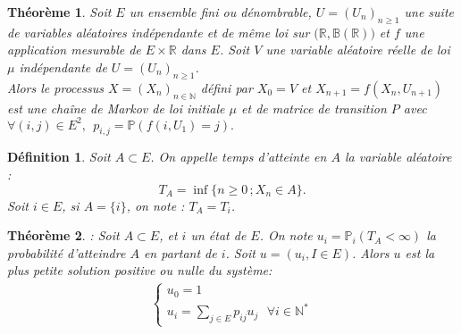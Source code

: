 \documentclass[12pt,a4paper]{report}
\newtheorem{thm}{Théorème}[section]
\newtheorem{definition}{Définition}[section]
\theoremstyle{remark}
\begin{document}
\begin{thm}\label{th1}
Soit $E$ un ensemble fini ou dénombrable, $U = (U_n)_{n\geq1}$ une suite de variables aléatoires indépendante et de même loi sur $(\mathbb{R},\mathbb{B(R))}$ et $f$ une application mesurable de $E \times \mathbb{R}$ dans $E$. Soit $V$ une variable aléatoire réelle de loi $\mu$ indépendante de 
$U = (U_n)_{n\geq1}$.\\
Alors le processus $X = (X_n)_{n\in \mathbb{N}}$ défini par $X_0=V$ et $X_{n+1}=f(X_{n},U_{n+1})$ est une chaîne de Markov de loi initiale $\mu$ et de matrice de transition $P$ avec $ \forall (i,j) \in E^2, \ \  p_{i,j}=\mathbb{P}(f(i,U_{1})=j).$
\end{thm}

\begin{definition}\label{def1}
Soit $A \subset E$. On appelle temps d'atteinte en $A$ la variable aléatoire : $$T_A = \inf\{{n\geqslant 0} \, ; X_n \in A\}.$$ 
Soit $i \in E$, si $A = \{i\}$, on note : $T_A = T_i$.
\end{definition}

\begin{thm}\label{th2}: Soit $A \subset E$, et $i$ un état de $E$. On note $u_i=\mathbb{P}_i(T_A <\infty)$ la probabilité d'atteindre $A$ en partant de $i$. Soit $u = (u_i , I \in E)$. Alors $u$ est la plus petite solution positive ou nulle du système:
\begin{align*}
 \left\{
\begin{array}{ll}
        u_0=1\\
        u_i= \sum\limits_{j\in E} p_{ij}u_j \ \ \ \forall i \in \mathbb{N}^*
    \end{array}
\right.
\end{align*}
\end{thm}
\end{document}
